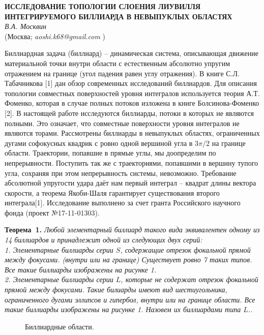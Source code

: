 \begin{center}{ \bf  ИССЛЕДОВАНИЕ ТОПОЛОГИИ СЛОЕНИЯ ЛИУВИЛЛЯ ИНТЕГРИРУЕМОГО БИЛЛИАРДА В НЕВЫПУКЛЫХ ОБЛАСТЯХ}\\
{\it В.А. Москвин } \\
(Москва; {\it aoshi.k68@gmail.com} )
\end{center}

Биллиардная задача (биллиард) -- динамическая система, описывающая движение материальной точки внутри области с естественным абсолютно упругим отражением на границе (угол падения равен углу отражения). В книге С.Л. Табачникова [1] дан обзор современных исследований биллиардов. Для описания топологии совместных поверхностей уровня интегралов используется теория А.Т. Фоменко, которая в случае полных потоков изложена в книге Болсинова-Фоменко [2]. В настоящей работе ис\-следуют\-ся биллиарды, потоки в которых не являются полными. Это означает, что совместные поверхности уровня интегралов не являются торами. Рассмотрены биллиарды в невыпуклых областях, ограниченных дугами софокусных квадрик с ровно одной вершиной угла в $3\pi/2$ на границе области.
Траектории, попавшие в прямые углы, мы доопределим по непрерывности. Поступить так же с траекториями, попавшими в вершину тупого угла, сохраняя при этом непрерывность системы, невозможно.
Требование абсолютной упругости удара даёт нам первый интеграл -- квадрат длины вектора скорости, а теорема Якоби-Шаля гарантирует существования второго интеграла[1]. Исследование выполнено за счет гранта Российского научного фонда (проект №17-11-01303).

\textbf{Теорема~1.} {\it 	Любой элементарный биллиард такого вида эквивалентен одному из 14 биллиардов и принадлежит одной из следующих двух серий: \\
	1. Элементарные биллиарды серии $S$, содержащие отрезок фокальной прямой между фокусами. (внутри или на границе) Существует ровно 7 таких типов. Все такие биллиарды изображены на рисунке 1. \\
	2. Элементарные биллиарды серии $L$, которые не содержат отрезок фокальной прямой между фокусами. Такие билиарды имеют вид шестиугольника, ограниченного дугами эллипсов и гипербол, внутри или на границе области. Все такие биллиарды изображены на рисунке 1. Назовем их биллиардами типа $L$..} \\

\begin{figure}[h]
	\caption{Биллиардные области.}
\end{figure}

